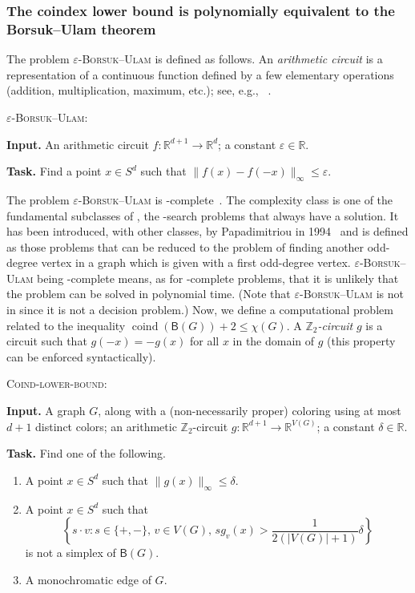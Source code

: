 \documentclass[12pt]{amsart}
\theoremstyle{definition}
\def\R{\mathbb{R}}
\def\Z{\mathbb{Z}}
\def\B{\mathsf{B}}
\renewcommand{\leq}{\leqslant}
\def\coind{\operatorname{coind}}
\begin{document}
\subsubsection*{The coindex lower bound is polynomially equivalent to the Borsuk--Ulam theorem}
The problem \textsc{$\varepsilon$-Borsuk--Ulam} is defined as follows. An {\em arithmetic circuit} is a representation of a continuous function defined by a few elementary operations (addition, multiplication, maximum, etc.); see, e.g., ~\cite{deligkas2021computing}.

\medskip

\noindent \textsc{$\varepsilon$-Borsuk--Ulam}:

{\bf Input.} An arithmetic circuit $f\colon \R^{d+1} \rightarrow \R^d$; a constant $\varepsilon\in\R$.

{\bf Task.} Find a point $x \in S^d$ such that $\|f(x) - f(-x)\|_{\infty} \leq \varepsilon$.

\medskip

The problem \textsc{$\varepsilon$-Borsuk--Ulam} is \PPA-complete~\cite{deligkas2021computing}. The complexity class \PPA{} is one of the fundamental subclasses of \TFNP, the \NP-search problems that always have a solution. It has been introduced, with other classes, by Papadimitriou in 1994~\cite{papadimitriou1994complexity} and is defined as those \TFNP{} problems that can be reduced to the problem of finding another odd-degree vertex in a graph which is given with a first odd-degree vertex. \textsc{$\varepsilon$-Borsuk--Ulam} being \PPA-complete means, as for \NP-complete problems, that it is unlikely that the problem can be solved in polynomial time. (Note that \textsc{$\varepsilon$-Borsuk--Ulam} is not in \NP{} since it is not a decision problem.) Now, we define a computational problem related to the inequality $\coind(\B(G))+2 \leq \chi(G)$. A {\em $\Z_2$-circuit} $g$ is a circuit such that $g(-x)=-g(x)$ for all $x$ in the domain of $g$ (this property can be enforced syntactically).

\medskip

\noindent\textsc{Coind-lower-bound}:

{\bf Input.} A graph $G$, along with a (non-necessarily proper) coloring using at most $d+1$ distinct colors; an arithmetic $\Z_2$-circuit $g\colon\R^{d+1}\rightarrow \R^{V(G)}$; a constant $\delta\in\R$.

{\bf Task.} Find one of the following.
\begin{enumerate}
\item\label{item:zero} A point $x \in S^d$ such that $\|g(x)\|_{\infty} \leq \delta$.
\item\label{item:non-embed} A point $x \in S^d$ such that 
\[
\left\{s \cdot v\colon s \in \{+,-\},\,  v \in V(G), \,  s g_v(x) > \frac 1 {2(|V(G)|+1)}\delta\right\}
\] is not a simplex of $\B(G)$.
\item\label{item:monoc} A monochromatic edge of $G$.
\end{enumerate}
\end{document}
